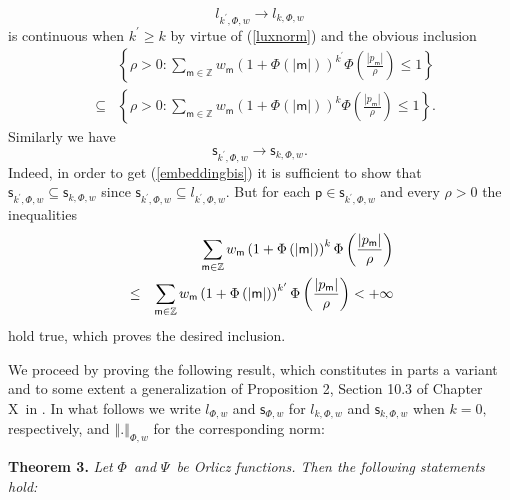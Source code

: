 \documentclass{article}
\begin{document}
\begin{equation*}
l_{k^{\prime },\Phi ,w}\rightarrow l_{k,\Phi ,w}
\end{equation*}%
is continuous when $k^{\prime }\geq k$ by virtue of (\ref{luxnorm}) and the
obvious inclusion%
\begin{eqnarray*}
&&\left\{ \rho >0:\sum_{\mathsf{m}\in \mathbb{Z}}w_{\mathsf{m}}\left( 1+\Phi
\left( \left\vert \mathsf{m}\right\vert \right) \right) ^{k^{\prime }}\Phi
\left( \frac{\left\vert p_{\mathsf{m}}\right\vert }{\rho }\right) \leq
1\right\} \\
&\subseteq &\left\{ \rho >0:\sum_{\mathsf{m}\in \mathbb{Z}}w_{\mathsf{m}%
}\left( 1+\Phi \left( \left\vert \mathsf{m}\right\vert \right) \right)
^{k}\Phi \left( \frac{\left\vert p_{\mathsf{m}}\right\vert }{\rho }\right)
\leq 1\right\} .
\end{eqnarray*}%
Similarly we have 
\begin{equation}
\mathsf{s}_{k^{\prime },\Phi ,w}\rightarrow \mathsf{s}_{k,\Phi ,w}.
\label{embeddingbis}
\end{equation}%
Indeed, in order to get (\ref{embeddingbis}) it is sufficient to show that $%
\mathsf{s}_{k^{\prime },\Phi ,w}\subseteq \mathsf{s}_{k,\Phi ,w}$ since $%
\mathsf{s}_{k^{\prime },\Phi ,w}\subseteq l_{k^{\prime },\Phi ,w}$. But for
each $\mathsf{p}\in \mathsf{s}_{k^{\prime },\Phi ,w}$ and every $\rho >0$
the inequalities%
\begin{eqnarray*}
&&\sum_{\mathsf{m}\in \mathbb{Z}}w_{\mathsf{m}}\left( 1+\Phi \left(
\left\vert \mathsf{m}\right\vert \right) \right) ^{k}\Phi \left( \frac{%
\left\vert p_{\mathsf{m}}\right\vert }{\rho }\right) \\
&\leq &\sum_{\mathsf{m}\in \mathbb{Z}}w_{\mathsf{m}}\left( 1+\Phi \left(
\left\vert \mathsf{m}\right\vert \right) \right) ^{k^{\prime }}\Phi \left( 
\frac{\left\vert p_{\mathsf{m}}\right\vert }{\rho }\right) <+\infty
\end{eqnarray*}%
hold true, which proves the desired inclusion.

We proceed by proving the following result, which constitutes in parts a
variant and to some extent a generalization of Proposition 2, Section 10.3
of Chapter X\ in \cite{raoren2}. In what follows we write $l_{\Phi ,w}$ and $%
\mathsf{s}_{\Phi ,w}$ for $l_{k,\Phi ,w}$ and $\mathsf{s}_{k,\Phi ,w}$ when $%
k=0,$ respectively, and $\left\Vert \mathsf{.}\right\Vert _{\Phi ,w}$ for
the corresponding norm:

\bigskip

\textbf{Theorem 3.} \textit{Let }$\Phi $\textit{\ and }$\Psi $\textit{\ be
Orlicz functions. Then the following statements hold:}
\end{document}
